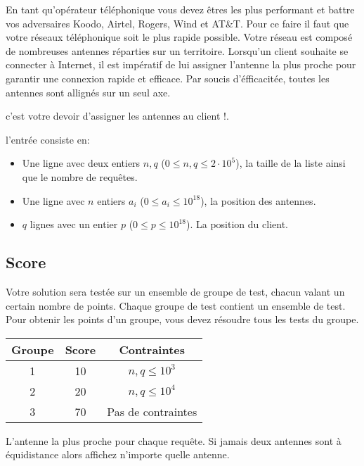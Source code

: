 
\newenvironment{Testgroup}{
	\subsection*{Score}
}{\par}



\newcommand{\maxa}{123456789}

En tant qu'opérateur téléphonique vous devez êtres les plus performant et battre vos adversaires Koodo, Airtel, Rogers, Wind et AT\&T. Pour ce faire il faut que votre réseaux téléphonique soit le plus rapide possible. Votre réseau est composé de nombreuses antennes réparties sur un territoire. Lorsqu’un client souhaite se connecter à Internet, il est impératif de lui assigner l’antenne la plus proche pour garantir une connexion rapide et efficace. Par soucis d'éfficacitée, toutes les antennes sont allignés sur un seul axe.

c'est votre devoir d'assigner les antennes au client !.

\begin{Input}
    l'entrée consiste en:
    \begin{itemize}
        \item Une ligne avec deux entiers $n, q$ ($0\leq n, q\leq 2 \cdot 10^5$), la taille de la liste ainsi que le nombre de requêtes.
        \item Une ligne avec $n$ entiers $a_i$ ($0  \leq a_i \leq 10^{18}$), la position des antennes.
        \item $q$ lignes avec un entier $p$ ($0 \leq p \leq 10^{18}$). La position du client.
    \end{itemize}
\end{Input}

\begin{Testgroup}
    Votre solution sera testée sur un ensemble de groupe de test, chacun valant un certain nombre de points. Chaque groupe de test contient un ensemble de test. Pour obtenir les points d'un groupe, vous devez résoudre tous les tests du groupe.

    {\par}

    \renewcommand{\arraystretch}{1.6} %
    \begin{table}[h!]
        \begin{tabular}{|c|c|c|}
        \hline
        \textbf{Groupe} & \textbf{Score} & \textbf{Contraintes} \\ \hline
        1 & 10 & \( n,q \leq 10^3 \) \\ \hline
        2 & 20 & \( n,q \leq 10^4 \) \\ \hline
        3 & 70 & Pas de contraintes\\ \hline
        \end{tabular}
    \end{table}

\end{Testgroup}

\begin{Output}
    L'antenne la plus proche pour chaque requête. Si jamais deux antennes sont à équidistance alors affichez n'importe quelle antenne.
\end{Output}
